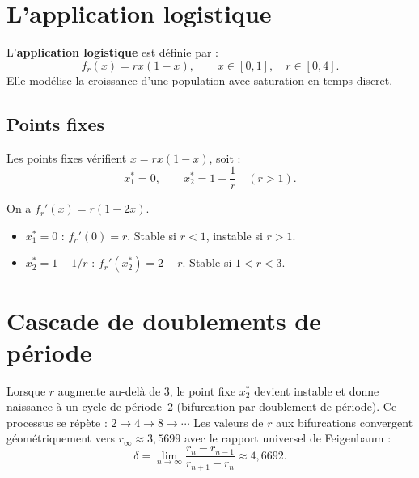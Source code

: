 \section{L'application logistique}
\label{sec:logistique_discrete}

\begin{definition}
L'\textbf{application logistique} est d\'efinie par :
\[
  f_r(x) = rx(1-x), \qquad x\in[0,1], \quad r\in[0,4].
\]
Elle mod\'elise la croissance d'une population avec saturation
en temps discret.
\end{definition}

\subsection{Points fixes}

Les points fixes v\'erifient $x=rx(1-x)$, soit :
\[
  x^*_1 = 0, \qquad x^*_2 = 1 - \frac{1}{r} \quad (r>1).
\]

\begin{proposition}
On a $f_r'(x) = r(1-2x)$.
\begin{itemize}
  \item $x^*_1=0$ : $f_r'(0)=r$.  Stable si $r<1$, instable si $r>1$.
  \item $x^*_2=1-1/r$ : $f_r'(x^*_2)=2-r$.  Stable si $1<r<3$.
\end{itemize}
\end{proposition}

\section{Cascade de doublements de p\'eriode}
\label{sec:doublement}

\begin{theoreme}
Lorsque $r$ augmente au-del\`a de $3$, le point fixe $x^*_2$
devient instable et donne naissance \`a un cycle de p\'eriode~$2$
(bifurcation par doublement de p\'eriode).  Ce processus se
r\'ep\`ete : $2\to 4\to 8\to\cdots$  Les valeurs de $r$ aux
bifurcations convergent g\'eom\'etriquement vers $r_\infty\approx 3{,}5699$
avec le rapport universel de Feigenbaum :
\[
  \delta = \lim_{n\to\infty}\frac{r_n - r_{n-1}}{r_{n+1}-r_n}
  \approx 4{,}6692.
\]
\end{theoreme}

